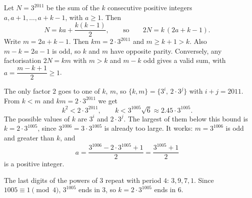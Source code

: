 Let $N=3^{2011}$ be the sum of the $k$ consecutive positive integers $a,a+1,\dots,a+k-1$, with $a\ge1$. Then
\[
N=ka+\dfrac{k(k-1)}{2},\qquad\text{so}\qquad 2N=k\,(2a+k-1).
\]
Write $m=2a+k-1$. Then $km=2\cdot3^{2011}$ and $m\ge k+1>k$. Also $m-k=2a-1$ is odd, so $k$ and $m$ have opposite parity. Conversely, any factorisation $2N=km$ with $m>k$ and $m-k$ odd gives a valid sum, with $a=\dfrac{m-k+1}{2}\ge1$.

The only factor $2$ goes to one of $k$, $m$, so $\{k,m\}=\{3^i,\,2\cdot3^j\}$ with $i+j=2011$. From $k<m$ and $km=2\cdot3^{2011}$ we get
\[
k^2<2\cdot3^{2011},\qquad k<3^{1005}\sqrt6\approx2.45\cdot3^{1005}.
\]
The possible values of $k$ are $3^i$ and $2\cdot3^j$. The largest of them below this bound is $k=2\cdot3^{1005}$, since $3^{1006}=3\cdot3^{1005}$ is already too large. It works: $m=3^{1006}$ is odd and greater than $k$, and
\[
a=\dfrac{3^{1006}-2\cdot3^{1005}+1}{2}=\dfrac{3^{1005}+1}{2}
\]
is a positive integer.

The last digits of the powers of $3$ repeat with period $4$: $3,9,7,1$. Since $1005\equiv1\pmod4$, $3^{1005}$ ends in $3$, so $k=2\cdot3^{1005}$ ends in $\boxed{6}$.
